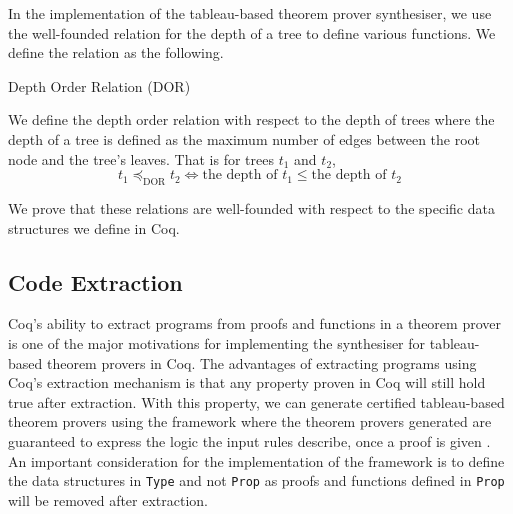 \documentclass{llncs}
\newcommand{\comment}[1]{}
\begin{document}
In the implementation of the tableau-based theorem prover synthesiser, we use
the well-founded relation for the depth of a tree to define various functions.
We define the relation as the following.
%
\comment{
we use
two main well-founded relations to define general recursive functions: the
length order of a list and the depth order of a tree like data structure.
We define the relations as the following.

\begin{definition}{Length Order Relation (LOR)}

We define the length order relation with respect to the length of lists.
That is for lists $l_1$ and $l_2$,

\begin{equation}
l_1 \preceq_{\textrm{LOR}} l_2 \iff \textrm{the
length of } l_1 \le \textrm{the length of } l_2
\label{lengthOrder}
\end{equation}
\end{definition}
}
%
\begin{definition}{Depth Order Relation (DOR)}

We define the depth order relation with respect to the depth of trees where the
depth of a tree is defined as the maximum number of edges between the root node
and the tree's leaves.
That is for trees $t_1$ and $t_2$,
%
\begin{equation}
t_1 \preceq_{\textrm{DOR}} t_2 \iff \textrm{the
depth of } t_1 \leq \textrm{the depth of } t_2
\label{depthOrder}
\end{equation}
\end{definition}
%
We prove that these relations are well-founded with respect to the specific
data structures we define in Coq.
%
\subsection{Code Extraction}
%
Coq's ability to extract programs from proofs and functions in a theorem prover
is one of the major motivations for implementing the synthesiser for
tableau-based theorem provers in Coq. The advantages of extracting programs
using Coq's extraction mechanism is that any property proven in Coq will still
hold true after extraction. With this property, we can generate certified
tableau-based theorem provers using the framework where the theorem provers
generated are guaranteed to express the logic the input rules describe, once
a proof is given \cite{letouzey2008extraction}. An important consideration for
the implementation of the framework is to define the data structures in
\verb+Type+ and not \verb+Prop+ as proofs and functions defined in \verb+Prop+
will be removed after extraction.
%
\end{document}
